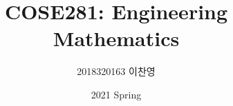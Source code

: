 

\title{COSE281: Engineering Mathematics}
\author{2018320163 이찬영}
\date{2021 Spring}


    \maketitle
    \tableofcontents
    \setimgdir


